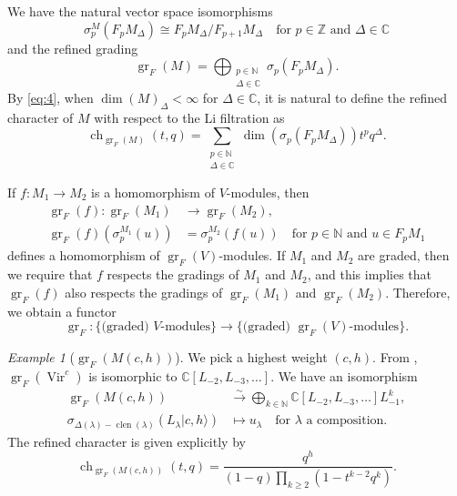 \documentclass[a4paper, 12pt, reqno]{amsart}
\theoremstyle{remark}
\newtheorem{example}[theorem]{Example}
\DeclareMathOperator{\Vir}{Vir}
\DeclareMathOperator{\ch}{ch}
\DeclareMathOperator{\clen}{clen}
\DeclareMathOperator{\gr}{gr}
\begin{document}
We have the natural vector space isomorphisms
\begin{equation*}
  \sigma^M_p(F_pM_{\Delta}) \cong F_pM_{\Delta}/F_{p + 1}M_{\Delta} \quad \text{for $p \in \mathbb{Z}$ and $\Delta \in \mathbb{C}$}
\end{equation*}
and the refined grading
\begin{equation}
  \label{eq:4}
  \gr_F(M) = \bigoplus_{\substack{p \in \mathbb{N} \\ \Delta \in \mathbb{C}}}\sigma_p(F_pM_{\Delta}).
\end{equation}
By \eqref{eq:4}, when $\dim(M)_{\Delta} < \infty$ for $\Delta \in \mathbb{C}$, it is natural to define the refined character of $M$ with respect to the Li filtration as
\begin{equation*}
  \ch_{\gr_F(M)}(t, q) = \sum_{\substack{p \in \mathbb{N} \\ \Delta \in \mathbb{C}}}\dim(\sigma_p(F_pM_{\Delta}))t^pq^{\Delta}.
\end{equation*}

If $f: M_1 \to M_2$ is a homomorphism of $V$-modules, then
\begin{align*}
  \gr_F(f): \gr_F(M_1) &\to \gr_F(M_2), \\
  \gr_F(f)(\sigma^{M_1}_p(u)) &= \sigma^{M_2}_p(f(u)) \quad \text{for $p \in \mathbb{N}$ and $u \in F_pM_1$}
\end{align*}
defines a homomorphism of $\gr_F(V)$-modules.
If $M_1$ and $M_2$ are graded, then we require that $f$ respects the gradings of $M_1$ and $M_2$, and this implies that $\gr_F(f)$ also respects the gradings of $\gr_F(M_1)$ and $\gr_F(M_2)$.
Therefore, we obtain a functor
\begin{equation*}
  \gr_F: \{\text{(graded) $V$-modules}\} \to \{\text{(graded) $\gr_F(V)$-modules}\}.
\end{equation*}

\begin{example}[$\gr_F(M(c, h))$]
  \label{exa:8}
  We pick a highest weight $(c, h)$.
  From , $\gr_F(\Vir^c)$ is isomorphic to $\mathbb{C}[L_{-2}, L_{-3}, \dots]$.
  We have an isomorphism
  \begin{align*}
    \gr_F(M(c, h)) &\xrightarrow{\sim} \bigoplus_{k \in \mathbb{N}}\mathbb{C}[L_{-2}, L_{-3}, \dots]L_{-1}^k, \\
    \sigma_{\Delta(\lambda) - \clen(\lambda)}(L_{\lambda}|c, h\rangle) &\mapsto u_{\lambda} \quad \text{for $\lambda$ a composition}.
  \end{align*}
  The refined character is given explicitly by
  \begin{equation*}
    \ch_{\gr_F(M(c, h))}(t, q) = \frac{q^h}{(1 - q)\prod_{k \ge 2}(1 - t^{k - 2}q^k)}.
  \end{equation*}
\end{example}
\end{document}
